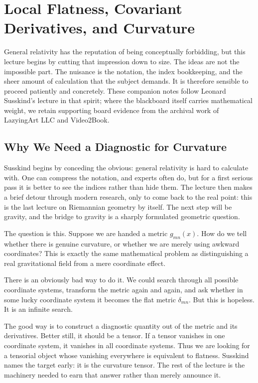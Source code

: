 \chapter{Local Flatness, Covariant Derivatives, and Curvature}

General relativity has the reputation of being conceptually forbidding, but this lecture begins by cutting that impression down to size. The ideas are not the impossible part. The nuisance is the notation, the index bookkeeping, and the sheer amount of calculation that the subject demands. It is therefore sensible to proceed patiently and concretely. These companion notes follow Leonard Susskind's lecture in that spirit; where the blackboard itself carries mathematical weight, we retain supporting board evidence from the archival work of LazyingArt LLC and Video2Book.

\section{Why We Need a Diagnostic for Curvature}

Susskind begins by conceding the obvious: general relativity is hard to calculate with. One can compress the notation, and experts often do, but for a first serious pass it is better to see the indices rather than hide them. The lecture then makes a brief detour through modern research, only to come back to the real point: this is the last lecture on Riemannian geometry by itself. The next step will be gravity, and the bridge to gravity is a sharply formulated geometric question.

The question is this. Suppose we are handed a metric \(g_{mn}(x)\). How do we tell whether there is genuine curvature, or whether we are merely using awkward coordinates? This is exactly the same mathematical problem as distinguishing a real gravitational field from a mere coordinate effect.

There is an obviously bad way to do it. We could search through all possible coordinate systems, transform the metric again and again, and ask whether in some lucky coordinate system it becomes the flat metric \(\delta_{mn}\). But this is hopeless. It is an infinite search.

The good way is to construct a diagnostic quantity out of the metric and its derivatives. Better still, it should be a tensor. If a tensor vanishes in one coordinate system, it vanishes in all coordinate systems. Thus we are looking for a tensorial object whose vanishing everywhere is equivalent to flatness. Susskind names the target early: it is the curvature tensor. The rest of the lecture is the machinery needed to earn that answer rather than merely announce it.

